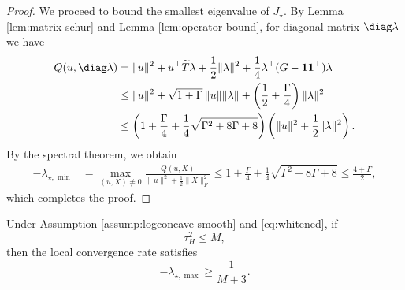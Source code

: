 \begin{proof}
    We proceed to bound the smallest eigenvalue of $J_\star$. By Lemma \ref{lem:matrix-schur} and Lemma \ref{lem:operator-bound}, for diagonal matrix $\diag \lambda$ we have
    \begin{align*}
        Q(u, \diag \lambda) &= \|u\|^2 + u^\top \widetilde{T} \lambda + \frac{1}{2} \|\lambda\|^2 + \frac{1}{4} \lambda^\top (G - \mathbf{1} \mathbf{1}^\top) \lambda \\
        &\leq \|u\|^2 + \sqrt{1 + \Gamma}\, \|u\| \|\lambda\| + \left( \frac{1}{2} + \frac{\Gamma}{4} \right) \|\lambda\|^2 \\
        &\leq \left( 1 + \frac{\Gamma}{4} + \frac{1}{4} \sqrt{\Gamma^2 + 8\Gamma + 8} \right) \left( \|u\|^2 + \frac{1}{2} \|\lambda\|^2 \right).
    \end{align*}
    By the spectral theorem, we obtain
    \begin{align*}
        -\lambda_{\star, \min} &= \max_{(u, X) \neq 0} \frac{Q (u, X)}{\|u\|^2 + \frac{1}{2} \|X\|_F^2} \leq 1 + \frac{\Gamma}{4} + \frac{1}{4} \sqrt{\Gamma^2 + 8\Gamma + 8} \leq \frac{4 + \Gamma}{2},
    \end{align*}
    which completes the proof.
\end{proof}

\begin{proposition}\label{prop:tau-rate-reduction}
    Under Assumption \ref{assump:logconcave-smooth} and \eqref{eq:whitened}, if
    \begin{equation*}
        \tau_H^2 \leq M,
    \end{equation*}
    then the local convergence rate satisfies
    \begin{equation*}
        -\lambda_{\star,\max}
        \geq
        \frac{1}{M+3}.
    \end{equation*}
\end{proposition}

